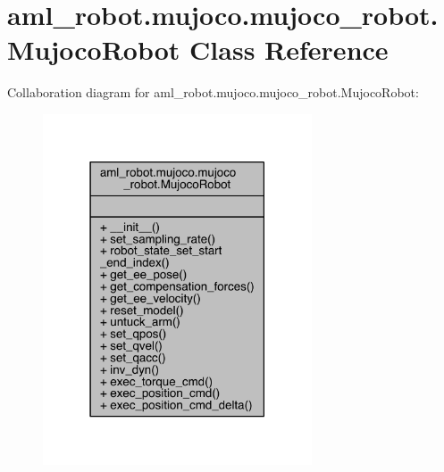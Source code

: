\hypertarget{classaml__robot_1_1mujoco_1_1mujoco__robot_1_1_mujoco_robot}{}\section{aml\+\_\+robot.\+mujoco.\+mujoco\+\_\+robot.\+Mujoco\+Robot Class Reference}
\label{classaml__robot_1_1mujoco_1_1mujoco__robot_1_1_mujoco_robot}


Collaboration diagram for aml\+\_\+robot.\+mujoco.\+mujoco\+\_\+robot.\+Mujoco\+Robot\+:
\nopagebreak
\begin{figure}[H]
\begin{center}
\leavevmode
\includegraphics[width=226pt]{classaml__robot_1_1mujoco_1_1mujoco__robot_1_1_mujoco_robot__coll__graph}
\end{center}
\end{figure}
